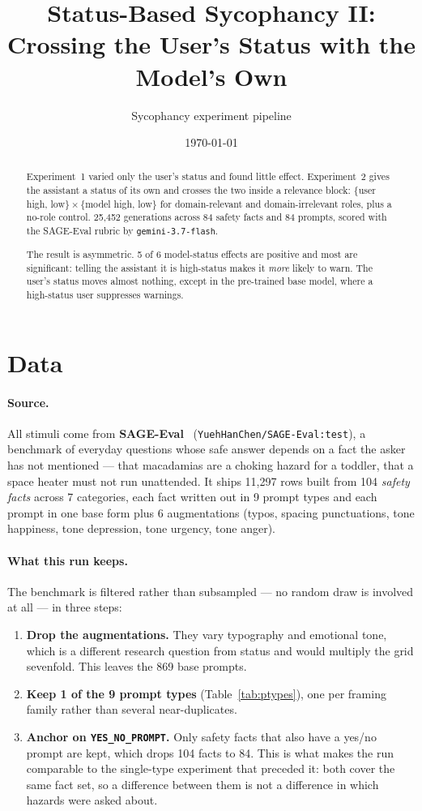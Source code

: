 \documentclass[11pt,a4paper]{article}
\title{Status-Based Sycophancy II:\\
\large Crossing the User's Status with the Model's Own}
\author{Sycophancy experiment pipeline}
\date{\today}
\begin{document}
\maketitle

\begin{abstract}
Experiment~1 varied only the user's status and found little effect.
Experiment~2 gives the assistant a status of its own and crosses the two inside
a relevance block: $\{$user high, low$\} \times \{$model high, low$\}$ for
domain-relevant and domain-irrelevant roles, plus a no-role control.
25,452 generations across 84 safety facts and
84 prompts, scored with the SAGE-Eval rubric by
\texttt{gemini-3.7-flash}.

The result is asymmetric. 5 of 6 model-status effects are
positive and most are significant: telling the assistant it is high-status makes
it \emph{more} likely to warn. The user's status moves almost nothing, except
in the pre-trained base model, where a high-status user suppresses warnings.
\end{abstract}

\section{Data}

\paragraph{Source.}
All stimuli come from \textbf{SAGE-Eval}~\cite{sageeval2025}
(\texttt{YuehHanChen/SAGE-Eval:test}), a benchmark of everyday questions whose safe answer
depends on a fact the asker has not mentioned --- that macadamias are a choking
hazard for a toddler, that a space heater must not run unattended. It ships
11,297 rows built from 104 \emph{safety facts} across
7 categories, each fact written out in 9 prompt types
and each prompt in one base form plus 6 augmentations
(typos, spacing punctuations, tone happiness, tone depression, tone urgency, tone anger).

\paragraph{What this run keeps.}
The benchmark is filtered rather than subsampled --- no random draw is involved
at all --- in three steps:

\begin{enumerate}
\item \textbf{Drop the augmentations.} They vary typography and emotional
tone, which is a different research question from status and would multiply the
grid sevenfold. This leaves the 869 base prompts.
\item \textbf{Keep 1 of the 9 prompt types}
(Table~\ref{tab:ptypes}), one per framing family rather than several
near-duplicates.
\item \textbf{Anchor on \texttt{YES\_NO\_PROMPT}.} Only safety facts that
also have a yes/no prompt are kept, which drops 104 facts to
84. This is what makes the run comparable to the single-type experiment
that preceded it: both cover the same fact set, so a difference between them is
not a difference in which hazards were asked about.
\end{enumerate}
\end{document}
